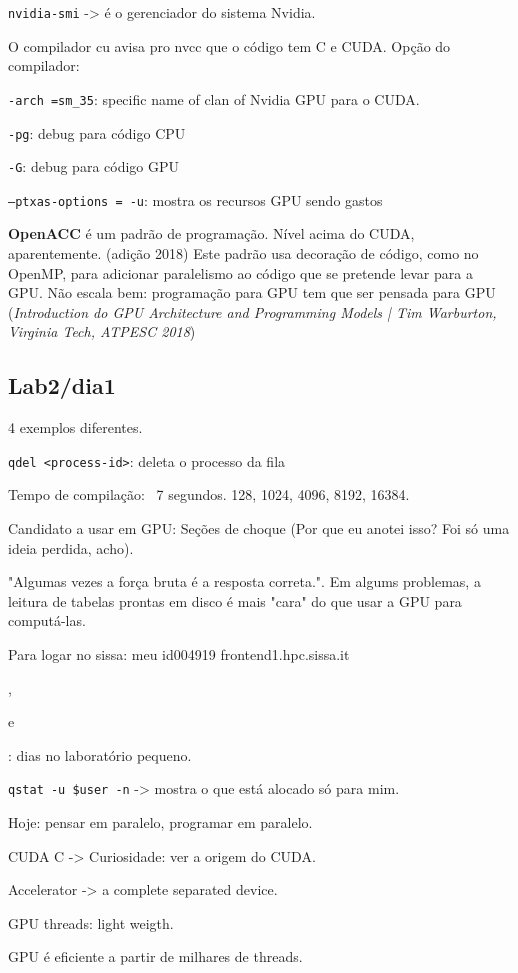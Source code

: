\documentclass[12pt]{report} %
\begin{document}
\texttt{nvidia-smi} -> é o gerenciador do sistema Nvidia.

O compilador cu avisa pro nvcc que o código tem C e CUDA. Opção do compilador:

\texttt{-arch =sm\_35}: specific name of clan of Nvidia GPU para o CUDA. 

\texttt{-pg}: debug para código CPU

\texttt{-G}: debug para código GPU

\texttt{--ptxas-options = -u}: mostra os recursos GPU sendo gastos

\textbf{OpenACC} é um padrão de programação. Nível acima do CUDA, aparentemente.
(adição 2018) Este padrão usa decoração de código, como no OpenMP, para adicionar 
paralelismo ao código que se pretende levar para a GPU. Não escala bem: programação 
para GPU tem que ser pensada para GPU (\textit{Introduction do GPU Architecture and Programming Models | Tim Warburton, Virginia Tech, ATPESC 2018})


\subsection*{Lab2/dia1}

4 exemplos diferentes.

\texttt{qdel <process-id>}: deleta o processo da fila

Tempo de compilação: ~7 segundos. 128, 1024, 4096, 8192, 16384.

Candidato a usar em GPU: Seções de choque (Por que eu anotei isso? Foi só uma ideia perdida, acho).

"Algumas vezes a força bruta é a resposta correta.". Em algums problemas, a leitura 
de tabelas prontas em disco é mais "cara" do que usar a GPU para computá-las.

Para logar no sissa: meu id004919
frontend1.hpc.sissa.it

\date{26/05/2015}, \date{28/05/2015} e \date{03/06/2015}: dias no laboratório pequeno.

\texttt{qstat -u \$user -n}  -> mostra o que está alocado só para mim.

Hoje: pensar em paralelo, programar em paralelo.

CUDA C -> Curiosidade: ver a origem do CUDA.

Accelerator -> a complete separated device.

GPU threads: light weigth.

GPU é eficiente a partir de milhares de threads.
\end{document}
